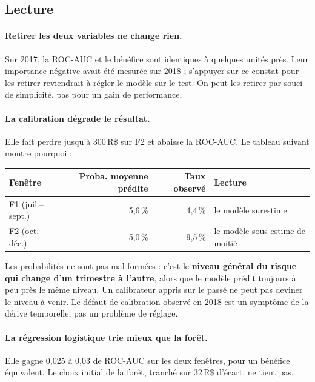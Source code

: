 \documentclass[11pt,a4paper]{article}
\newcommand{\RS}{\,R\$}
\begin{document}
\subsection{Lecture}

\paragraph{Retirer les deux variables ne change rien.} Sur 2017, la ROC-AUC et le bénéfice
sont identiques à quelques unités près. Leur importance négative avait été mesurée sur 2018 ;
s'appuyer sur ce constat pour les retirer reviendrait à régler le modèle sur le test. On peut
les retirer par souci de simplicité, pas pour un gain de performance.

\paragraph{La calibration dégrade le résultat.} Elle fait perdre jusqu'à 300\RS{} sur F2 et
abaisse la ROC-AUC. Le tableau suivant montre pourquoi :

\begin{center}
\begin{tabular}{@{}lrrl@{}}
\toprule
Fenêtre & Proba. moyenne prédite & Taux observé & Lecture \\
\midrule
F1 (juil.–sept.) & 5,6\,\% & 4,4\,\% & le modèle surestime \\
F2 (oct.–déc.) & 5,0\,\% & 9,5\,\% & le modèle sous-estime de moitié \\
\bottomrule
\end{tabular}
\end{center}

\begin{encadre}[colframe=prudence, title=Conclusion principale]
Les probabilités ne sont pas mal formées : c'est le \textbf{niveau général du risque qui change
d'un trimestre à l'autre}, alors que le modèle prédit toujours à peu près le même niveau. Un
calibrateur appris sur le passé ne peut pas deviner le niveau à venir. Le défaut de calibration
observé en 2018 est un symptôme de la dérive temporelle, pas un problème de réglage.
\end{encadre}

\paragraph{La régression logistique trie mieux que la forêt.} Elle gagne 0,025 à 0,03 de
ROC-AUC sur les deux fenêtres, pour un bénéfice équivalent. Le choix initial de la forêt,
tranché sur 32\RS{} d'écart, ne tient pas.
\end{document}
